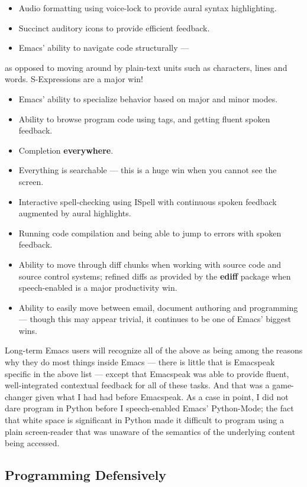 \documentclass[11pt]{article}
\begin{document}
\begin{itemize}
\item Audio formatting using voice-lock to provide aural syntax
highlighting.
\item Succinct auditory icons to provide efficient feedback.
\item Emacs' ability to navigate code structurally   —
\end{itemize}
as opposed to moving around by plain-text units such as
  characters, lines and words. S-Expressions are a major win!
\begin{itemize}
\item Emacs' ability to specialize behavior based on major and
minor modes.
\item Ability to browse program code using  tags, and getting
fluent spoken feedback.
\item Completion \textbf{everywhere}.
\item Everything is searchable   —   this is a huge win when you
cannot see the screen.
\item Interactive spell-checking using ISpell with continuous
spoken feedback augmented by aural highlights.
\item Running code compilation  and being able to jump to errors
with spoken feedback.
\item Ability to move through diff chunks when working with source
code and source control systems; refined diffs as provided by
the \textbf{ediff} package when speech-enabled is a major
productivity win.
\item Ability to easily move between email, document authoring and
programming — though this may appear trivial, it continues to
be one of Emacs' biggest wins.
\end{itemize}


Long-term Emacs users will recognize all of the above as being
among the reasons why they do most things inside Emacs — there is
little that is Emacspeak specific in the above list — except that
Emacspeak was able to provide fluent, well-integrated contextual
feedback for all of these tasks. And that was a game-changer
given what I had had before Emacspeak. As a case in point, I did
not dare program in Python before I speech-enabled Emacs'
Python-Mode; the fact that white space is significant in Python
made it difficult to program using a plain screen-reader that was
unaware of the semantics of the underlying content being
accessed.
\subsection{Programming Defensively}
\label{sec-5-1}
\end{document}
